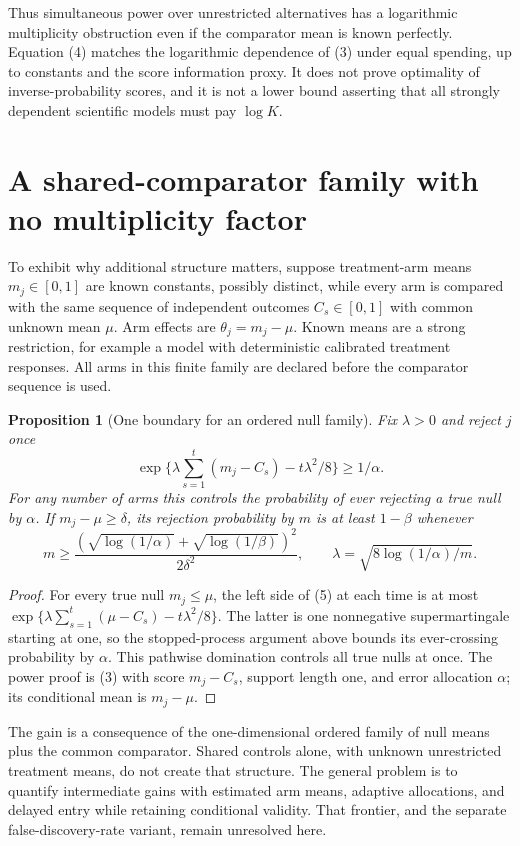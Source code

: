 \documentclass[11pt]{article}
\newtheorem{proposition}[theorem]{Proposition}
\theoremstyle{remark}
\begin{document}
Thus simultaneous power over unrestricted alternatives has a logarithmic
multiplicity obstruction even if the comparator mean is known perfectly.
Equation (4) matches the logarithmic dependence of (3) under equal spending,
up to constants and the score information proxy. It does not prove optimality
of inverse-probability scores, and it is not a lower bound asserting that
all strongly dependent scientific models must pay $\log K$.

\section{A shared-comparator family with no multiplicity factor}
To exhibit why additional structure matters, suppose treatment-arm means
$m_j\in[0,1]$ are known constants, possibly distinct, while every arm is
compared with the same sequence of independent outcomes
$C_s\in[0,1]$ with common unknown mean $\mu$. Arm effects are
$\theta_j=m_j-\mu$. Known means are a strong restriction, for example a
model with deterministic calibrated treatment responses. All arms in this
finite family are declared before the comparator sequence is used.

\begin{proposition}[One boundary for an ordered null family]
Fix $\lambda>0$ and reject $j$ once
\[
 \exp\{\lambda\textstyle\sum_{s=1}^t(m_j-C_s)-t\lambda^2/8\}
       \geq1/\alpha. \tag{5}
\]
For any number of arms this controls the probability of ever rejecting a
true null by $\alpha$. If $m_j-\mu\geq\delta$, its rejection probability
by $m$ is at least $1-\beta$ whenever
\[
 m\geq\frac{(\sqrt{\log(1/\alpha)}+
                    \sqrt{\log(1/\beta)})^2}{2\delta^2},
 \qquad\lambda=\sqrt{8\log(1/\alpha)/m}.
\]
\end{proposition}
\begin{proof}
For every true null $m_j\leq\mu$, the left side of (5) at each time is
at most $\exp\{\lambda\sum_{s=1}^t(\mu-C_s)-t\lambda^2/8\}$.
The latter is one nonnegative supermartingale starting at one, so the
stopped-process argument above bounds its ever-crossing probability by
$\alpha$. This pathwise domination controls all true nulls at once.
The power proof is (3) with score $m_j-C_s$, support length one,
and error allocation $\alpha$; its conditional mean is $m_j-\mu$.
\end{proof}

The gain is a consequence of the one-dimensional ordered family of null
means plus the common comparator. Shared controls alone, with unknown
unrestricted treatment means, do not create that structure. The general
problem is to quantify intermediate gains with estimated arm means,
adaptive allocations, and delayed entry while retaining conditional
validity. That frontier, and the separate false-discovery-rate variant,
remain unresolved here.
\end{document}
